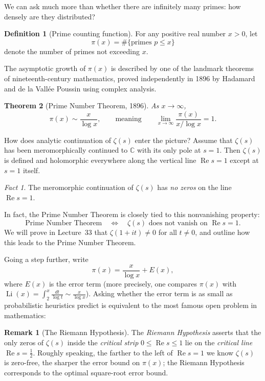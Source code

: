 \documentclass[11pt]{article}
\theoremstyle{plain}
\newtheorem{theorem}{Theorem}[section]
\theoremstyle{definition}
\newtheorem{definition}[theorem]{Definition}
\theoremstyle{boldremark}
\newtheorem*{remark}{Remark}
\theoremstyle{remark}
\newtheorem*{fact}{Fact}
\numberwithin{equation}{section}
\newcommand{\C}{\mathbb{C}}
\DeclareMathOperator{\Real}{Re}
\begin{document}
We can ask much more than whether there are infinitely many primes: how
densely are they distributed?

\begin{definition}[Prime counting function]
For any positive real number $x>0$, let
\[
 \pi(x) = \#\{\text{primes } p \leq x\}
\]
denote the number of primes not exceeding $x$.
\end{definition}

The asymptotic growth of $\pi(x)$ is described by one of the landmark
theorems of nineteenth-century mathematics, proved independently in 1896 by
Hadamard and de la Vall\'ee Poussin using complex analysis.

\begin{theorem}[Prime Number Theorem, 1896]
As $x\to\infty$,
\[
 \boxed{\displaystyle
  \pi(x) \sim \frac{x}{\log x},
  \qquad\text{meaning}\qquad
  \lim_{x\to\infty}\frac{\pi(x)}{x/\log x} = 1.}
\]
\end{theorem}

How does analytic continuation of $\zeta(s)$ enter the picture? Assume that
$\zeta(s)$ has been meromorphically continued to $\C$ with its only pole at
$s=1$. Then $\zeta(s)$ is defined and holomorphic everywhere along the
vertical line $\Real s = 1$ except at $s=1$ itself.

\begin{fact}
The meromorphic continuation of $\zeta(s)$ has \emph{no zeros} on the line
$\Real s = 1$.
\end{fact}

In fact, the Prime Number Theorem is closely tied to this nonvanishing
property:
\[
 \text{Prime Number Theorem}
 \quad\Longleftrightarrow\quad
 \zeta(s) \text{ does not vanish on } \Real s = 1.
\]
We will prove in Lecture~33 that $\zeta(1+it)\neq 0$ for all $t\neq 0$, and
outline how this leads to the Prime Number Theorem.

Going a step further, write
\[
 \pi(x) = \frac{x}{\log x} + E(x),
\]
where $E(x)$ is the error term (more precisely, one compares $\pi(x)$ with
$\operatorname{Li}(x)=\int_2^x \frac{dt}{\log t}\sim \frac{x}{\log x}$).
Asking whether the error term is as small as probabilistic heuristics
predict is equivalent to the most famous open problem in mathematics:

\begin{remark}[The Riemann Hypothesis]
The \emph{Riemann Hypothesis} asserts that the only zeros of $\zeta(s)$
inside the \emph{critical strip} $0\leq\Real s\leq 1$ lie on the
\emph{critical line} $\Real s = \tfrac12$. Roughly speaking, the farther
to the left of $\Real s = 1$ we know $\zeta(s)$ is zero-free, the sharper
the error bound on $\pi(x)$; the Riemann Hypothesis corresponds to the
optimal square-root error bound.
\end{remark}
\end{document}

